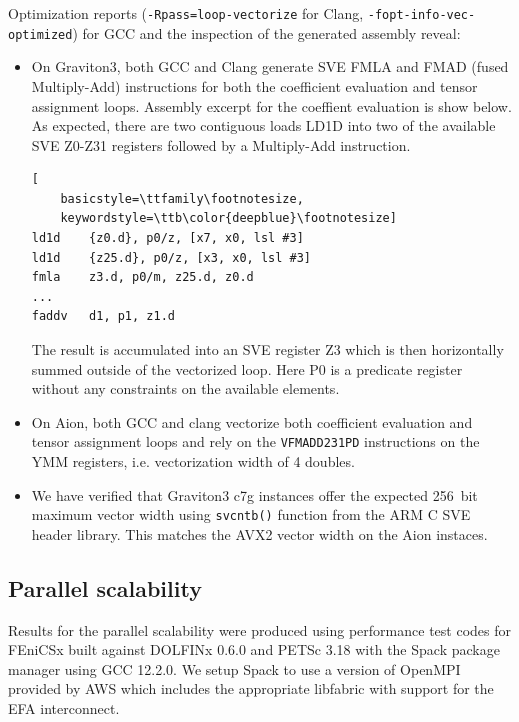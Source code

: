 Optimization reports (\texttt{-Rpass=loop-vectorize} for Clang,
\texttt{-fopt-info-vec-optimized}) for GCC and the inspection of the generated
assembly reveal:
\begin{itemize}
    \item On Graviton3, both GCC and Clang generate SVE FMLA and FMAD (fused
    Multiply-Add) instructions for both the coefficient evaluation and tensor
    assignment loops. Assembly excerpt for the coeffient evaluation is show
    below. As expected, there are two contiguous loads LD1D into two of the
    available SVE Z0-Z31 registers followed by a Multiply-Add instruction.
\begin{lstlisting}[
    basicstyle=\ttfamily\footnotesize,
    keywordstyle=\ttb\color{deepblue}\footnotesize]
ld1d    {z0.d}, p0/z, [x7, x0, lsl #3]
ld1d    {z25.d}, p0/z, [x3, x0, lsl #3]
fmla    z3.d, p0/m, z25.d, z0.d
...
faddv   d1, p1, z1.d
\end{lstlisting}
    The result is accumulated into an SVE register Z3 which is then horizontally
    summed outside of the vectorized loop. Here P0 is a predicate
    register without any constraints on the available elements.
    \item On Aion, both GCC and clang vectorize both coefficient evaluation and
    tensor assignment loops and rely on the \lstinline{VFMADD231PD} instructions
    on the YMM registers, i.e. vectorization width of 4 doubles.
    \item  We have verified that Graviton3 c7g instances offer the expected
    \SI{256}{bit} maximum vector width using \lstinline{svcntb()} function from
    the ARM C SVE header library. This matches the AVX2 vector width on the
    Aion instaces.
\end{itemize}

\subsection*{Parallel scalability}

Results for the parallel scalability were produced using performance test codes
for FEniCSx \cite{Wells2023} built against DOLFINx 0.6.0 and PETSc 3.18
\cite{petsc} with the Spack package manager using GCC 12.2.0. We setup Spack to
use a version of OpenMPI provided by AWS which includes the appropriate
libfabric with support for the EFA interconnect.


